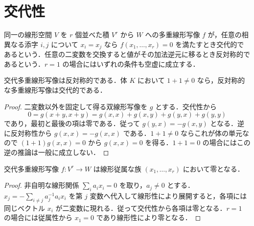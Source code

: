 \section{交代性}
\begin{defn}[交代多重線形写像と反対称性]
同一の線形空間 $V$ を $r$ 個並べた積 $V^r$ から $W$ への多重線形写像 $f$ が，任意の相異なる添字 $i,j$ について $x_i=x_j$ なら $f(x_1,\ldots,x_r)=0$ を満たすとき交代的であるという．任意の二変数を交換すると値がその加法逆元に移るとき反対称的であるという．$r=1$ の場合にはいずれの条件も空虚に成立する．
\end{defn}
\begin{prop}[交代性と反対称性の関係]
交代多重線形写像は反対称的である．体 $K$ において $1+1\ne0$ なら，反対称的な多重線形写像は交代的である．
\end{prop}
\begin{proof}
二変数以外を固定して得る双線形写像を $g$ とする．交代性から
\[
 0=g(x+y,x+y)=g(x,x)+g(x,y)+g(y,x)+g(y,y)
\]
であり，最初と最後の項は零である．従って $g(y,x)=-g(x,y)$ となる．逆に反対称性から $g(x,x)=-g(x,x)$ である．$1+1\ne0$ ならこれが体の単元なので $(1+1)g(x,x)=0$ から $g(x,x)=0$ を得る．$1+1=0$ の場合にはこの逆の推論は一般に成立しない．
\end{proof}
\begin{prop}[交代写像と線形従属族]
交代多重線形写像 $f:V^r\to W$ は線形従属な族 $(x_1,\ldots,x_r)$ において零となる．
\end{prop}
\begin{proof}
非自明な線形関係 $\sum_i a_i x_i=0$ を取り，$a_j\ne0$ とする．$x_j=-\sum_{i\ne j}a_j^{-1}a_i x_i$ を第 $j$ 変数へ代入して線形性により展開すると，各項には同じベクトル $x_i$ が二変数に現れる．従って交代性から各項は零となる．$r=1$ の場合には従属性から $x_1=0$ であり線形性により零となる．
\end{proof}
